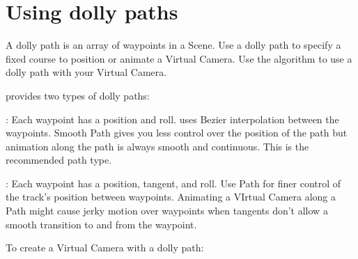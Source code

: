 \chapter{Using dolly paths}
\hypertarget{md__hey_tea_9_2_library_2_package_cache_2com_8unity_8cinemachine_0d2_89_87_2_documentation_0i_2_cinemachine_dolly}{}\label{md__hey_tea_9_2_library_2_package_cache_2com_8unity_8cinemachine_0d2_89_87_2_documentation_0i_2_cinemachine_dolly}
\label{md__hey_tea_9_2_library_2_package_cache_2com_8unity_8cinemachine_0d2_89_87_2_documentation_0i_2_cinemachine_dolly_autotoc_md677}%
%
 A dolly path is an array of waypoints in a Scene. Use a dolly path to specify a fixed course to position or animate a Virtual Camera. Use the  algorithm to use a dolly path with your Virtual Camera.





 provides two types of dolly paths\+:


\begin{DoxyItemize}
\item {}\+: Each waypoint has a position and roll.  uses Bezier interpolation between the waypoints. Smooth Path gives you less control over the position of the path but animation along the path is always smooth and continuous. This is the recommended path type.
\item {}\+: Each waypoint has a position, tangent, and roll. Use Path for finer control of the track’s position between waypoints. Animating a VIrtual Camera along a Path might cause jerky motion over waypoints when tangents don’t allow a smooth transition to and from the waypoint.
\end{DoxyItemize}

To create a Virtual Camera with a dolly path\+:


